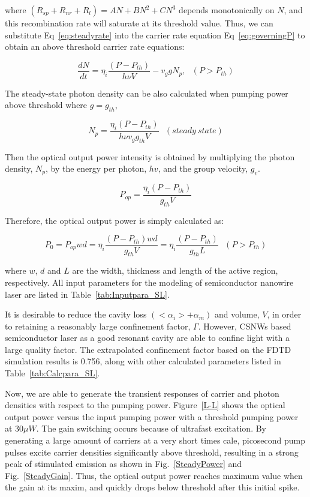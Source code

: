 where $(R_{sp} + R_{nr} + R_{l}) =AN + BN^2 +CN^3$ depends monotonically on
$N$, and this recombination rate will saturate at its threshold value.  Thus,
we can substitute Eq~\ref{eq:steadyrate} into the carrier rate equation
Eq~\ref{eq:governingP} to obtain an above threshold carrier rate equations:

\begin{equation}
  \frac{dN}{dt} = \eta_i \frac{(P - P_{th})}{h\nu{V}} - v_{g}gN_p,~~~   (P > P_{th})
\end{equation}

The steady-state photon density can be also calculated when pumping power above
threshold where $g = g_{th}$,

\begin{equation}
  N_p = \frac{\eta_i (P - P_{th})}{h{\nu}v_{g}g_{th}V}~~~   (steady~ state)
\end{equation}

Then the optical output power intensity is obtained
by multiplying the photon density, $N_p$, by the energy per
photon, $hv$, and the group velocity, $g_v$.

\begin{equation}
  P_{op} = \frac{\eta_{i}(P-P_{th})}{g_{th}V}
\end{equation}

Therefore, the optical output power is simply calculated as:

\begin{equation}
  P_0 = P_{op}wd =\eta_i\frac{(P-P_{th})wd}{g_{th}V}=\eta_i\frac{(P-P_{th})}{g_{th}L}~~~(P > P_{th})
\end{equation}

where $w$, $d$ and $L$ are the width, thickness and length of the active
region, respectively. All input parameters for the modeling of semiconductor
nanowire laser are listed in Table~\ref{tab:Inputpara_SL}.



It is desirable to reduce the cavity loss $(<\alpha_i> + \alpha_m)$ and volume,
$V$, in order to retaining a reasonably large confinement factor, $\Gamma$.
However, CSNWs based semiconductor laser as a good resonant cavity are able to
confine light with a large quality factor. The extrapolated confinement
factor based on the FDTD simulation results is 0.756, along with other
calculated parameters listed in Table~\ref{tab:Calcpara_SL}.



Now, we are able to generate the transient responses of carrier and photon
densities with respect to the pumping power. Figure~\ref{L-L} shows the optical
output power versus the input pumping power with a threshold pumping power at
$30 \mu{W}$. The gain switching occurs because of ultrafast excitation. By
generating a large amount of carriers at a very short times cale, picosecond
pump pulses excite carrier densities significantly above threshold, resulting
in a strong peak of stimulated emission as shown in Fig.~\ref{SteadyPower} and
Fig.~\ref{SteadyGain}. Thus, the optical output power reaches maximum value
when the gain at its maxim, and quickly drops below threshold after this
initial spike.

